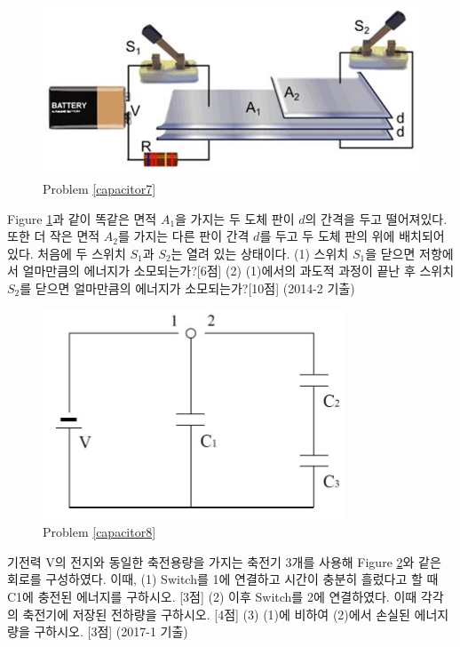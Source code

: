 \begin{problem}\label{capacitor7}
\begin{figure}[h]
\centering\includegraphics[scale=0.4]{Pictures/capacitor7.PNG}
\caption{Problem \ref{capacitor7}}
\label{fig:capacitor7}
\end{figure}
Figure \ref{fig:capacitor7}과 같이 똑같은 면적 $A_1$을 가지는 두 도체 판이 $d$의 간격을 두고 떨어져있다. 또한 더 작은 면적 $A_2$를 가지는 다른 판이 간격 $d$를 두고 두 도체 판의 위에 배치되어 있다. 처음에 두 스위치 $S_1$과 $S_2$는 열려 있는 상태이다. (1) 스위치 $S_1$을 닫으면 저항에서 얼마만큼의 에너지가 소모되는가?[6점] (2) (1)에서의 과도적 과정이 끝난 후 스위치 $S_2$를 닫으면 얼마만큼의 에너지가 소모되는가?[10점] (2014-2 기출)
\end{problem}

\begin{problem}\label{capacitor8}
\begin{figure}[h]
\centering\includegraphics[scale=0.4]{Pictures/capacitor8.PNG}
\caption{Problem \ref{capacitor8}}
\label{fig:capacitor8}
\end{figure}
기전력 V의 전지와 동일한 축전용량을 가지는 축전기 3개를 사용해 Figure \ref{fig:capacitor8}와 같은 회로를 구성하였다. 이때, (1) Switch를 1에 연결하고 시간이 충분히 흘렀다고 할 때 C1에 충전된 에너지를 구하시오. [3점] (2) 이후 Switch를 2에 연결하였다. 이때 각각의 축전기에 저장된 전하량을 구하시오. [4점] (3) (1)에 비하여 (2)에서 손실된 에너지량을 구하시오. [3점] (2017-1 기출)
\end{problem}

